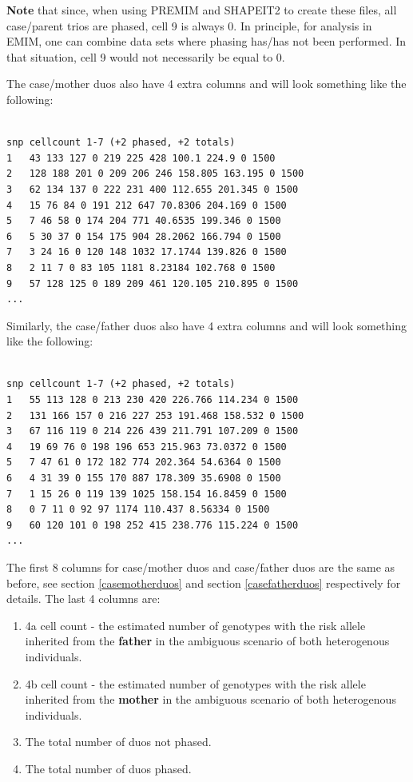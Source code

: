 \documentclass[a4paper,12pt]{article}
\begin{document}
{\bf Note} that since, when using PREMIM and SHAPEIT2 to create these files, all case/parent trios are phased, cell 9 is always 0. In principle, for analysis in EMIM, one can combine data sets where phasing has/has not been performed. In that situation, cell 9 would not necessarily be equal to 0. 

The case/mother duos also have 4 extra columns and will look something like the following: 
\vspace{0.35cm} \begin{lstlisting}

snp	cellcount 1-7 (+2 phased, +2 totals)
1	43 133 127 0 219 225 428 100.1 224.9 0 1500
2	128 188 201 0 209 206 246 158.805 163.195 0 1500
3	62 134 137 0 222 231 400 112.655 201.345 0 1500
4	15 76 84 0 191 212 647 70.8306 204.169 0 1500
5	7 46 58 0 174 204 771 40.6535 199.346 0 1500
6	5 30 37 0 154 175 904 28.2062 166.794 0 1500
7	3 24 16 0 120 148 1032 17.1744 139.826 0 1500
8	2 11 7 0 83 105 1181 8.23184 102.768 0 1500
9	57 128 125 0 189 209 461 120.105 210.895 0 1500
...

\end{lstlisting} \vspace{0.35cm}
Similarly, the case/father duos also have 4 extra columns and will look something like the following: 
\vspace{0.35cm} \begin{lstlisting}

snp	cellcount 1-7 (+2 phased, +2 totals)
1	55 113 128 0 213 230 420 226.766 114.234 0 1500
2	131 166 157 0 216 227 253 191.468 158.532 0 1500
3	67 116 119 0 214 226 439 211.791 107.209 0 1500
4	19 69 76 0 198 196 653 215.963 73.0372 0 1500
5	7 47 61 0 172 182 774 202.364 54.6364 0 1500
6	4 31 39 0 155 170 887 178.309 35.6908 0 1500
7	1 15 26 0 119 139 1025 158.154 16.8459 0 1500
8	0 7 11 0 92 97 1174 110.437 8.56334 0 1500
9	60 120 101 0 198 252 415 238.776 115.224 0 1500
...

\end{lstlisting} \vspace{0.35cm}
The first 8 columns for case/mother duos and case/father duos are the same as before, see  section \ref{casemotherduos} and  section \ref{casefatherduos} respectively for details. The last 4 columns are: 
\begin{enumerate}

\item 4a cell count - the estimated number of genotypes with the risk allele inherited from the {\bf father} in the ambiguous scenario of both heterogenous individuals. 
\item 4b cell count - the estimated number of genotypes with the risk allele inherited from the {\bf mother} in the ambiguous scenario of both heterogenous individuals. 
\item The total number of duos not phased. 
\item The total number of duos phased.\end{enumerate}
\end{document}

